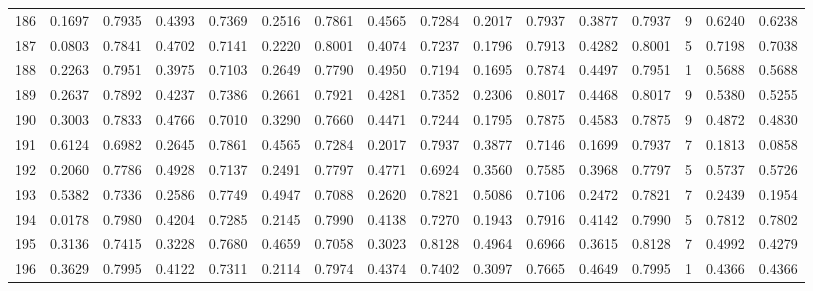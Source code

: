 \begin{tabular}{lrrrrrrrrrrrrrrr}
186 &      0.1697 &  0.7935 &  0.4393 &  0.7369 &  0.2516 &  0.7861 &  0.4565 &  0.7284 &  0.2017 &  0.7937 &   0.3877 &     0.7937 &      9 &                    0.6240 &                     0.6238 \\
187 &      0.0803 &  0.7841 &  0.4702 &  0.7141 &  0.2220 &  0.8001 &  0.4074 &  0.7237 &  0.1796 &  0.7913 &   0.4282 &     0.8001 &      5 &                    0.7198 &                     0.7038 \\
188 &      0.2263 &  0.7951 &  0.3975 &  0.7103 &  0.2649 &  0.7790 &  0.4950 &  0.7194 &  0.1695 &  0.7874 &   0.4497 &     0.7951 &      1 &                    0.5688 &                     0.5688 \\
189 &      0.2637 &  0.7892 &  0.4237 &  0.7386 &  0.2661 &  0.7921 &  0.4281 &  0.7352 &  0.2306 &  0.8017 &   0.4468 &     0.8017 &      9 &                    0.5380 &                     0.5255 \\
190 &      0.3003 &  0.7833 &  0.4766 &  0.7010 &  0.3290 &  0.7660 &  0.4471 &  0.7244 &  0.1795 &  0.7875 &   0.4583 &     0.7875 &      9 &                    0.4872 &                     0.4830 \\
191 &      0.6124 &  0.6982 &  0.2645 &  0.7861 &  0.4565 &  0.7284 &  0.2017 &  0.7937 &  0.3877 &  0.7146 &   0.1699 &     0.7937 &      7 &                    0.1813 &                     0.0858 \\
192 &      0.2060 &  0.7786 &  0.4928 &  0.7137 &  0.2491 &  0.7797 &  0.4771 &  0.6924 &  0.3560 &  0.7585 &   0.3968 &     0.7797 &      5 &                    0.5737 &                     0.5726 \\
193 &      0.5382 &  0.7336 &  0.2586 &  0.7749 &  0.4947 &  0.7088 &  0.2620 &  0.7821 &  0.5086 &  0.7106 &   0.2472 &     0.7821 &      7 &                    0.2439 &                     0.1954 \\
194 &      0.0178 &  0.7980 &  0.4204 &  0.7285 &  0.2145 &  0.7990 &  0.4138 &  0.7270 &  0.1943 &  0.7916 &   0.4142 &     0.7990 &      5 &                    0.7812 &                     0.7802 \\
195 &      0.3136 &  0.7415 &  0.3228 &  0.7680 &  0.4659 &  0.7058 &  0.3023 &  0.8128 &  0.4964 &  0.6966 &   0.3615 &     0.8128 &      7 &                    0.4992 &                     0.4279 \\
196 &      0.3629 &  0.7995 &  0.4122 &  0.7311 &  0.2114 &  0.7974 &  0.4374 &  0.7402 &  0.3097 &  0.7665 &   0.4649 &     0.7995 &      1 &                    0.4366 &                     0.4366 \\

\end{tabular}
